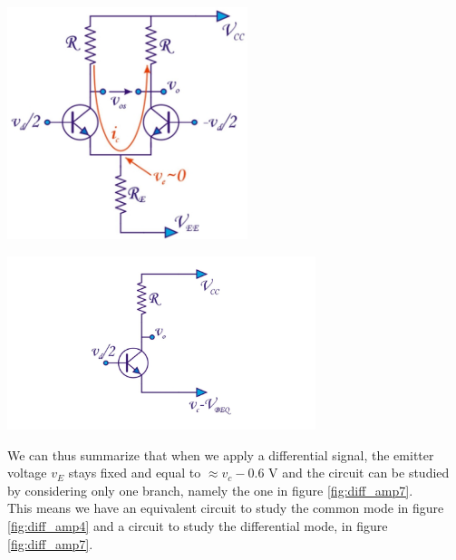 \begin{minipage}{.5\textwidth}
	\centering
	\includegraphics[width=7cm]{figures/ch02/diff_amp6.jpg}
	\label{fig:diff_amp6}
\end{minipage}%
\begin{minipage}{.5\textwidth}
	\centering
	\includegraphics[width=9cm]{figures/ch02/diff_amp7.jpg}
	\label{fig:diff_amp7}
\end{minipage}

We can thus summarize that when we apply a differential signal, the emitter voltage $v_E$ stays fixed and equal to $\approx v_c - 0.6$ V and the circuit can be studied by considering only one branch, namely the one in figure \ref{fig:diff_amp7}.\\
This means we have an equivalent circuit to study the common mode in figure \ref{fig:diff_amp4} and a circuit to study the differential mode, in figure \ref{fig:diff_amp7}.

